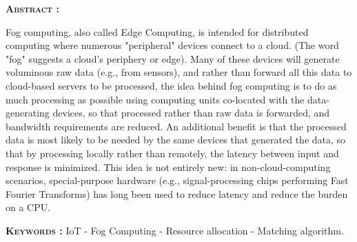 \textsc{\textbf{Abstract :}}

Fog computing, also called Edge Computing, is intended for distributed computing where numerous "peripheral" devices connect to a cloud. (The word "fog" suggests a cloud's periphery or edge). Many of these devices will generate voluminous raw data (e.g., from sensors), and rather than forward all this data to cloud-based servers to be processed, the idea behind fog computing is to do as much processing as possible using computing units co-located with the data-generating devices, so that processed rather than raw data is forwarded, and bandwidth requirements are reduced. An additional benefit is that the processed data is most likely to be needed by the same devices that generated the data, so that by processing locally rather than remotely, the latency between input and response is minimized. This idea is not entirely new: in non-cloud-computing scenarios, special-purpose hardware (e.g., signal-processing chips performing Fast Fourier Transforms) has long been used to reduce latency and reduce the burden on a CPU.

\textsc{\textbf{Keywords :}} IoT - Fog Computing - Resource allocation - Matching algorithm.\\ \\